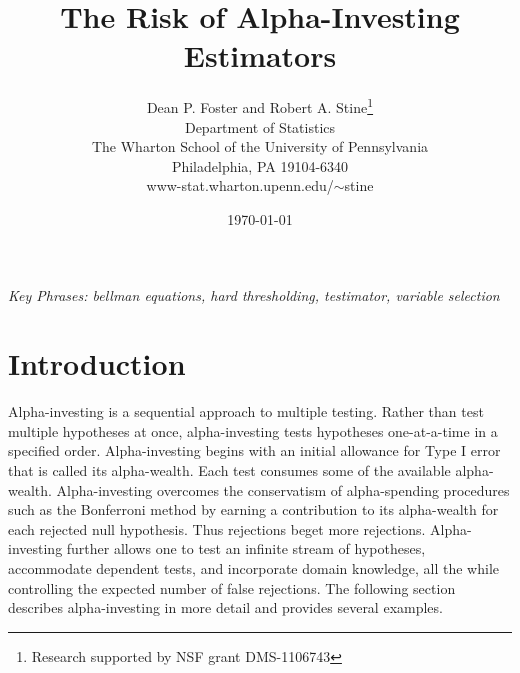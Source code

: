 \documentclass[12pt]{article}
\title{ The Risk  of Alpha-Investing Estimators }
\author{
        Dean P. Foster and Robert A. Stine\thanks{Research supported by NSF grant DMS-1106743 }  \\
        Department of Statistics            \\
        The Wharton School of the University of Pennsylvania \\
        Philadelphia, PA 19104-6340                          \\
        www-stat.wharton.upenn.edu/$\sim$stine 
}
\date{\today}
\begin{document}
\maketitle 


\vspace{0.05in}

\noindent
{\it Key Phrases: bellman equations, hard thresholding, testimator, variable selection}

\clearpage


\section{ Introduction }

 Alpha-investing is a sequential approach to multiple testing.  Rather than test
 multiple hypotheses at once, alpha-investing tests hypotheses one-at-a-time in
 a specified order.  Alpha-investing begins with an initial allowance for Type I
 error that is called its alpha-wealth.  Each test consumes some of the
 available alpha-wealth.  Alpha-investing overcomes the conservatism of
 alpha-spending procedures such as the Bonferroni method by earning a
 contribution to its alpha-wealth for each rejected null hypothesis.  Thus
 rejections beget more rejections.  Alpha-investing further allows one to test
 an infinite stream of hypotheses, accommodate dependent tests, and incorporate
 domain knowledge, all the while controlling the expected number of false
 rejections. The following section describes alpha-investing in more detail and
 provides several examples.
\end{document}

